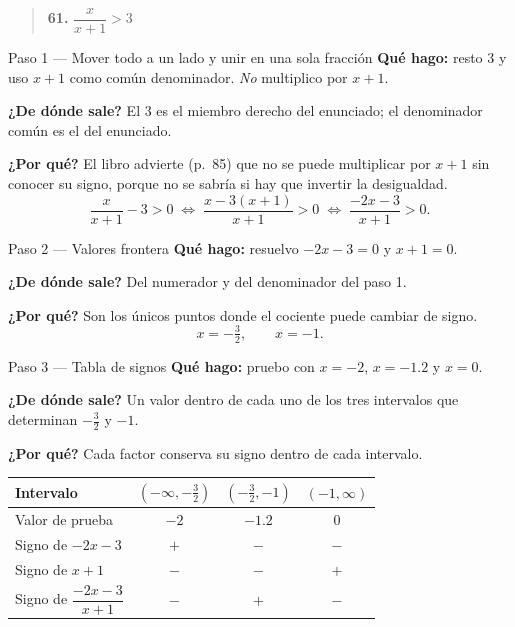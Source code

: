 \documentclass[11pt]{article}
\begin{document}
\begin{quote}
\textbf{61.} $\dfrac{x}{x+1}>3$
\end{quote}

\begin{paso}{Paso 1 --- Mover todo a un lado y unir en una sola fracción}
\textbf{Qué hago:} resto $3$ y uso $x+1$ como común denominador. \emph{No} multiplico por $x+1$.

\textbf{¿De dónde sale?} El $3$ es el miembro derecho del enunciado; el denominador común es el del enunciado.

\textbf{¿Por qué?} El libro advierte (p.~85) que no se puede multiplicar por $x+1$ sin conocer su signo, porque no se sabría si hay que invertir la desigualdad.
\[
\frac{x}{x+1}-3>0 \;\Longleftrightarrow\; \frac{x-3(x+1)}{x+1}>0 \;\Longleftrightarrow\; \frac{-2x-3}{x+1}>0.
\]
\end{paso}

\begin{paso}{Paso 2 --- Valores frontera}
\textbf{Qué hago:} resuelvo $-2x-3=0$ y $x+1=0$.

\textbf{¿De dónde sale?} Del numerador y del denominador del paso 1.

\textbf{¿Por qué?} Son los únicos puntos donde el cociente puede cambiar de signo.
\[
x=-\tfrac32, \qquad x=-1.
\]
\end{paso}

\begin{paso}{Paso 3 --- Tabla de signos}
\textbf{Qué hago:} pruebo con $x=-2$, $x=-1.2$ y $x=0$.

\textbf{¿De dónde sale?} Un valor dentro de cada uno de los tres intervalos que determinan $-\tfrac32$ y $-1$.

\textbf{¿Por qué?} Cada factor conserva su signo dentro de cada intervalo.

\begin{center}
\begin{tabular}{|l|c|c|c|}
\hline
Intervalo & $\left(-\infty,-\tfrac32\right)$ & $\left(-\tfrac32,-1\right)$ & $(-1,\infty)$ \\
\hline
Valor de prueba & $-2$ & $-1.2$ & $0$ \\
Signo de $-2x-3$ & $+$ & $-$ & $-$ \\
Signo de $x+1$ & $-$ & $-$ & $+$ \\
\hline
Signo de $\dfrac{-2x-3}{x+1}$ & $-$ & $+$ & $-$ \\
\hline
\end{tabular}
\end{center}
\end{paso}
\end{document}
